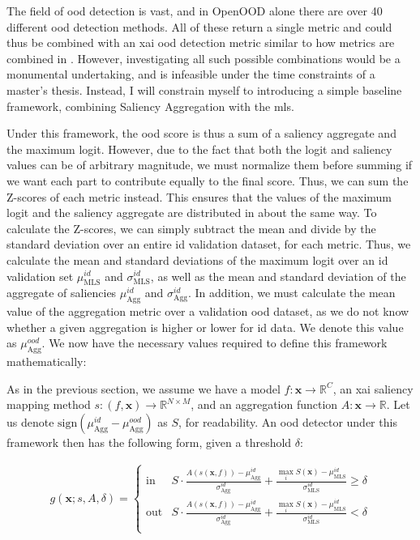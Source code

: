 \documentclass[UKenglish]{uiomasterthesis} %
\newcommand{\R}{\mathbb{R}}
\theoremstyle{definition}
\begin{document}
The field of \ac{ood} detection is vast, and in OpenOOD alone there are over 40 different \ac{ood} detection methods. All of these return a single metric and could thus be combined with an \ac{xai} \ac{ood} detection metric similar to how metrics are combined in \cite{combood}. However, investigating all such possible combinations would be a monumental undertaking, and is infeasible under the time constraints of a master's thesis. Instead, I will constrain myself to introducing a simple baseline framework, combining Saliency Aggregation with the \ac{mls}.

Under this framework, the \ac{ood} score is thus a sum of a saliency aggregate and the maximum logit. However, due to the fact that both the logit and saliency values can be of arbitrary magnitude, we must normalize them before summing if we want each part to contribute equally to the final score. Thus, we can sum the Z-scores of each metric instead. This ensures that the values of the maximum logit and the saliency aggregate are distributed in about the same way. To calculate the Z-scores, we can simply subtract the mean and divide by the standard deviation over an entire \ac{id} validation dataset, for each metric. Thus, we calculate the mean and standard deviations of the maximum logit over an \ac{id} validation set $\mu_{\text{MLS}}^{id}$ and $\sigma_{\text{MLS}}^{id}$, as well as the mean and standard deviation of the aggregate of saliencies $\mu_{\text{Agg}}^{id}$ and $\sigma_{\text{Agg}}^{id}$. In addition, we must calculate the mean value of the aggregation metric over a validation \ac{ood} dataset, as we do not know whether a given aggregation is higher or lower for \ac{id} data. We denote this value as $\mu_{\text{Agg}}^{ood}$. We now have the necessary values required to define this framework mathematically:

As in the previous section, we assume we have a model $f: \bm{x} \to \R^C$, an \ac{xai} saliency mapping method $s: (f, \bm{x}) \to \R^{N \times M}$, and an aggregation function $A: \bm{x} \rightarrow \R$. Let us denote $\text{sign}(\mu_{\text{Agg}}^{id} - \mu_{\text{Agg}}^{ood})$ as $S$, for readability. An \ac{ood} detector under this framework then has the following form, given a threshold $\delta$:

{\large
\begin{align}
    g(\bm{x}; s, A, \delta)=\begin{cases} 
    \text{in } &  S \cdot \frac{A(s(\bm{x}, f)) - \mu_{\text{Agg}}^{id}}{\sigma_{\text{Agg}}^{id}} + \frac{\max_i S(\bm{x}) - \mu_{\text{MLS}}^{id}}{\sigma_{\text{MLS}}^{id}} \ge \delta \\[10pt]
    \text{out} &  S \cdot \frac{A(s(\bm{x}, f)) - \mu_{\text{Agg}}^{id}}{\sigma_{\text{Agg}}^{id}} + \frac{\max_i S(\bm{x}) - \mu_{\text{MLS}}^{id}}{\sigma_{\text{MLS}}^{id}} < \delta \\
   \end{cases}
\label{eq:aggregate}
\end{align}
}
\end{document}
